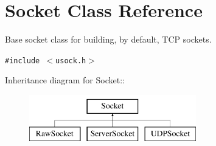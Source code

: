 \hypertarget{classSocket}{
\section{Socket Class Reference}
\label{classSocket}
}
Base socket class for building, by default, TCP sockets.  


{\tt \#include $<$usock.h$>$}

Inheritance diagram for Socket::\begin{figure}[H]
\begin{center}
\leavevmode
\includegraphics[height=2cm]{classSocket}
\end{center}
\end{figure}
